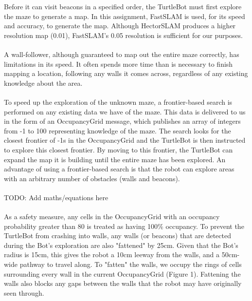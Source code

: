 \documentclass[titlepage,12pt,a4paper]{article}
\begin{document}
Before it can visit beacons in a specified order, the TurtleBot must first explore the maze to generate a map. In this assignment, FastSLAM is used, for its speed and accuracy, to generate the map. Although HectorSLAM produces a higher resolution map (0.01), FastSLAM's 0.05 resolution is sufficient for our purposes.\\
\\
A wall-follower, although guaranteed to map out the entire maze correctly, has limitations in its speed. It often spends more time than is necessary to finish mapping a location, following any walls it comes across, regardless of any existing knowledge about the area.\\
\\
To speed up the exploration of the unknown maze, a frontier-based search is performed on any existing data we have of the maze. This data is delivered to us in the form of an OccupancyGrid message, which publishes an array of integers from -1 to 100 representing knowledge of the maze. The search looks for the closest frontier of -1s in the OccupancyGrid and the TurtleBot is then instructed to explore this closest frontier. By moving to this frontier, the TurtleBot can expand the map it is building until the entire maze has been explored. An advantage of using a frontier-based search is that the robot can explore areas with an arbitrary number of obstacles (walls and beacons). \\
\\
TODO: Add maths/equations here\\
\\
As a safety measure, any cells in the OccupancyGrid with an occupancy probability greater than 80 is treated as having 100\% occupancy. To prevent the TurtleBot from crashing into walls, any walls (or beacons) that are detected during the Bot's exploration are also "fattened" by 25cm. Given that the Bot's radius is 15cm, this gives the robot a 10cm leeway from the walls, and a 50cm-wide pathway to travel along. To "fatten" the walls, we occupy the rings of cells surrounding every wall in the current OccupancyGrid (Figure 1). Fattening the walls also blocks any gaps between the walls that the robot may have originally seen through.\\


\pagebreak
\end{document}
